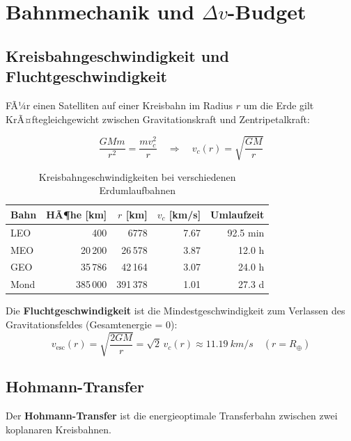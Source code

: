 ﻿\documentclass[12pt,a4paper]{article}
\begin{document}
\section{Bahnmechanik und $\Delta v$-Budget}

\subsection{Kreisbahngeschwindigkeit und Fluchtgeschwindigkeit}

FÃ¼r einen Satelliten auf einer Kreisbahn im Radius $r$ um die Erde gilt
KrÃ¤ftegleichgewicht zwischen Gravitationskraft und Zentripetalkraft:

\[
  \frac{GMm}{r^2} = \frac{mv_c^2}{r}
  \quad\Rightarrow\quad
  v_c(r) = \sqrt{\frac{GM}{r}}
\]

\begin{table}[H]
\centering
\caption{Kreisbahngeschwindigkeiten bei verschiedenen Erdumlaufbahnen}
\label{tab:bahnen}
\begin{tabular}{lrrrr}
\toprule
\textbf{Bahn} & \textbf{HÃ¶he [km]} & \textbf{$r$ [km]} & \textbf{$v_c$ [km/s]} & \textbf{Umlaufzeit}\\
\midrule
LEO      & 400    & 6778   & 7.67 & 92.5 min\\
MEO      & 20\,200 & 26\,578 & 3.87 & 12.0 h\\
GEO      & 35\,786 & 42\,164 & 3.07 & 24.0 h\\
Mond     & 385\,000 & 391\,378 & 1.01 & 27.3 d\\
\bottomrule
\end{tabular}
\end{table}

Die \textbf{Fluchtgeschwindigkeit} ist die Mindestgeschwindigkeit zum Verlassen des
Gravitationsfeldes (Gesamtenergie = 0):
\[
  v_{\mathrm{esc}}(r) = \sqrt{\frac{2GM}{r}} = \sqrt{2}\,v_c(r)
  \approx \SI{11.19}{km/s} \quad (r = R_\oplus)
\]

\subsection{Hohmann-Transfer}

Der \textbf{Hohmann-Transfer} ist die energieoptimale Transferbahn zwischen zwei
koplanaren Kreisbahnen.
\end{document}
